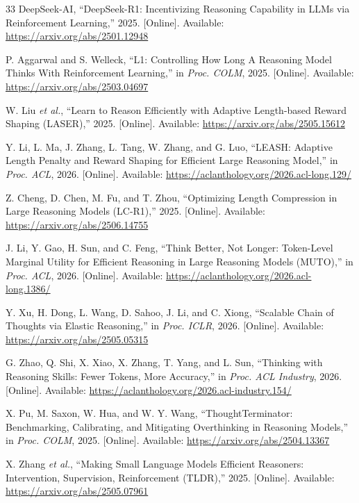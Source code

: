 \documentclass[conference]{IEEEtran}
\begin{document}
\begin{thebibliography}{33}
DeepSeek-AI, ``DeepSeek-R1: Incentivizing Reasoning Capability in LLMs via Reinforcement Learning,'' 2025. [Online]. Available: \url{https://arxiv.org/abs/2501.12948}

P. Aggarwal and S. Welleck, ``L1: Controlling How Long A Reasoning Model Thinks With Reinforcement Learning,'' in \emph{Proc. COLM}, 2025. [Online]. Available: \url{https://arxiv.org/abs/2503.04697}

W. Liu \emph{et al.}, ``Learn to Reason Efficiently with Adaptive Length-based Reward Shaping (LASER),'' 2025. [Online]. Available: \url{https://arxiv.org/abs/2505.15612}

Y. Li, L. Ma, J. Zhang, L. Tang, W. Zhang, and G. Luo, ``LEASH: Adaptive Length Penalty and Reward Shaping for Efficient Large Reasoning Model,'' in \emph{Proc. ACL}, 2026. [Online]. Available: \url{https://aclanthology.org/2026.acl-long.129/}

Z. Cheng, D. Chen, M. Fu, and T. Zhou, ``Optimizing Length Compression in Large Reasoning Models (LC-R1),'' 2025. [Online]. Available: \url{https://arxiv.org/abs/2506.14755}

J. Li, Y. Gao, H. Sun, and C. Feng, ``Think Better, Not Longer: Token-Level Marginal Utility for Efficient Reasoning in Large Reasoning Models (MUTO),'' in \emph{Proc. ACL}, 2026. [Online]. Available: \url{https://aclanthology.org/2026.acl-long.1386/}

Y. Xu, H. Dong, L. Wang, D. Sahoo, J. Li, and C. Xiong, ``Scalable Chain of Thoughts via Elastic Reasoning,'' in \emph{Proc. ICLR}, 2026. [Online]. Available: \url{https://arxiv.org/abs/2505.05315}

G. Zhao, Q. Shi, X. Xiao, X. Zhang, T. Yang, and L. Sun, ``Thinking with Reasoning Skills: Fewer Tokens, More Accuracy,'' in \emph{Proc. ACL Industry}, 2026. [Online]. Available: \url{https://aclanthology.org/2026.acl-industry.154/}

X. Pu, M. Saxon, W. Hua, and W. Y. Wang, ``ThoughtTerminator: Benchmarking, Calibrating, and Mitigating Overthinking in Reasoning Models,'' in \emph{Proc. COLM}, 2025. [Online]. Available: \url{https://arxiv.org/abs/2504.13367}

X. Zhang \emph{et al.}, ``Making Small Language Models Efficient Reasoners: Intervention, Supervision, Reinforcement (TLDR),'' 2025. [Online]. Available: \url{https://arxiv.org/abs/2505.07961}


\end{thebibliography}
\end{document}
